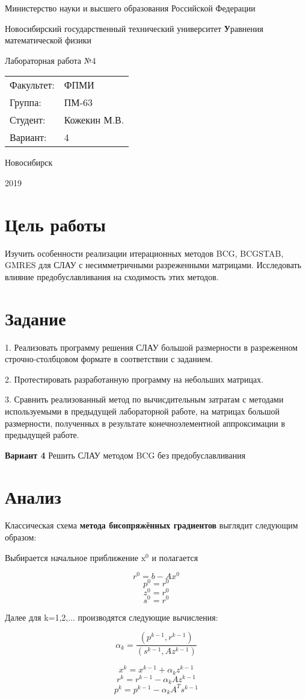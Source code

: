 \documentclass[12pt, a4paper]{article}
\newcommand{\insertTitle}[6]{
\begin{titlepage}
	\begin{center}
    	\large
		Министерство науки и высшего образования Российской Федерации
		
		Новосибирский государственный технический университет
		\vfill
		{\textbf #1}
		
		Лабораторная работа №#2
		\vfill
	\end{center}
	
	\begin{tabular}{ m{7em}  m{7em} }
	Факультет: & ФПМИ \\ 
	Группа: & #3 \\  
	Студент: & #4 \\
	Вариант: & #5
	\end{tabular}
	\vfill

\begin{center}
Новосибирск

#6
\end{center}
\end{titlepage}
}
\begin{document}
\setlength{\abovedisplayskip}{0.1pt}
\setlength{\belowdisplayskip}{0.1pt}

\insertTitle{Уравнения математической физики}{4}{ПМ-63}{Кожекин М.В.}{4}{2019}


\section{Цель работы}
Изучить особенности реализации итерационных методов BCG, BCGSTAB, GMRES для СЛАУ с несимметричными разреженными матрицами. Исследовать влияние предобуславливания на сходимость этих методов.


\section{Задание}
1. Реализовать программу решения СЛАУ большой размерности в разреженном строчно-столбцовом формате в соответствии с заданием.

2. Протестировать разработанную программу на небольших матрицах.

3. Сравнить реализованный метод по вычисдительным затратам с методами используемыми в предыдущей лабораторной работе, на матрицах большой размерности, полученных в результате конечноэлементной аппроксимации в предыдущей работе.

{\bf Вариант 4}
Решить СЛАУ методом BCG без предобуславливания


\section{Анализ}
Классическая схема {\bf метода бисопряжённых градиентов} выглядит следующим образом:

Выбирается начальное приближение $\text{x}^0$ и полагается

\[ r^0 = b - Ax^0 \]
\[ p^0 = r^0 \]
\[ z^0 = r^0 \]
\[ s^0 = r^0 \]

Далее для k=1,2,... производятся следующие вычисления:

\[ \alpha_k = \frac{( p^{k-1}, r^{k-1} )} {( s^{k-1}, Az^{k-1 }) } \]

\[ x^k = x^{k-1} + \alpha_k z^{k-1} \]
\[ r^k = r^{k-1} - \alpha_k Az^{k-1} \]
\[ p^k = p^{k-1} - \alpha_k A^{T}s^{k-1} \]
\end{document}
